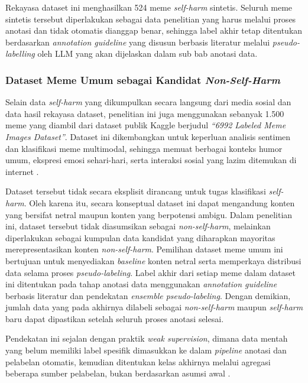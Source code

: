 Rekayasa dataset ini menghasilkan 524 meme \textit{self-harm} sintetis. Seluruh meme sintetis tersebut diperlakukan sebagai data penelitian yang harus melalui proses anotasi dan tidak otomatis dianggap benar, sehingga label akhir tetap ditentukan berdasarkan \textit{annotation guideline} yang disusun berbasis literatur melalui \textit{pseudo-labelling} oleh LLM yang akan dijelaskan dalam sub bab anotasi data.

\subsubsection{Dataset Meme Umum sebagai Kandidat \textit{Non-Self-Harm}} \label{subsubsec:dataset_meme_umum_non_self_harm}
Selain data \textit{self-harm} yang dikumpulkan secara langsung dari media sosial dan data hasil rekayasa dataset, penelitian ini juga menggunakan sebanyak 1.500 meme yang diambil dari dataset publik Kaggle berjudul \textit{``6992 Labeled Meme Images Dataset''}. Dataset ini dikembangkan untuk keperluan analisis sentimen dan klasifikasi meme multimodal, sehingga memuat berbagai konteks humor umum, ekspresi emosi sehari-hari, serta interaksi sosial yang lazim ditemukan di internet \cite{javaid_6992_meme_images_2023}.

Dataset tersebut tidak secara eksplisit dirancang untuk tugas klasifikasi \textit{self-harm}. Oleh karena itu, secara konseptual dataset ini dapat mengandung konten yang bersifat netral maupun konten yang berpotensi ambigu. Dalam penelitian ini, dataset tersebut tidak diasumsikan sebagai \textit{non-self-harm}, melainkan diperlakukan sebagai kumpulan data kandidat yang diharapkan mayoritas merepresentasikan konten \textit{non-self-harm}. Pemilihan dataset meme umum ini bertujuan untuk menyediakan \textit{baseline} konten netral serta memperkaya distribusi data selama proses \textit{pseudo-labeling}. Label akhir dari setiap meme dalam dataset ini ditentukan pada tahap anotasi data menggunakan \textit{annotation guideline} berbasis literatur dan pendekatan \textit{ensemble pseudo-labeling}. Dengan demikian, jumlah data yang pada akhirnya dilabeli sebagai \textit{non-self-harm} maupun \textit{self-harm} baru dapat dipastikan setelah seluruh proses anotasi selesai.

Pendekatan ini sejalan dengan praktik \textit{weak supervision}, dimana data mentah yang belum memiliki label spesifik dimasukkan ke dalam \textit{pipeline} anotasi dan pelabelan otomatis, kemudian ditentukan kelas akhirnya melalui agregasi beberapa sumber pelabelan, bukan berdasarkan asumsi awal \cite{ratner2019}.


